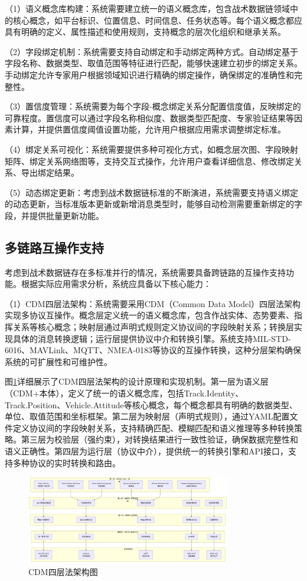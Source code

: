 （1）语义概念库构建：系统需要建立统一的语义概念库，包含战术数据链领域中的核心概念，如平台标识、位置信息、时间信息、任务状态等。每个语义概念都应具有明确的定义、属性描述和使用规则，支持概念的层次化组织和继承关系。

（2）字段绑定机制：系统需要支持自动绑定和手动绑定两种方式。自动绑定基于字段名称、数据类型、取值范围等特征进行匹配，能够快速建立初步的绑定关系。手动绑定允许专家用户根据领域知识进行精确的绑定操作，确保绑定的准确性和完整性。

（3）置信度管理：系统需要为每个字段-概念绑定关系分配置信度值，反映绑定的可靠程度。置信度可以通过字段名称相似度、数据类型匹配度、专家验证结果等因素计算，并提供置信度阈值设置功能，允许用户根据应用需求调整绑定标准。

（4）绑定关系可视化：系统需要提供多种可视化方式，如概念层次图、字段映射矩阵、绑定关系网络图等，支持交互式操作，允许用户查看详细信息、修改绑定关系、导出绑定结果。

（5）动态绑定更新：考虑到战术数据链标准的不断演进，系统需要支持语义绑定的动态更新，当标准版本更新或新增消息类型时，能够自动检测需要重新绑定的字段，并提供批量更新功能。

\subsection{多链路互操作支持}
考虑到战术数据链存在多标准并行的情况，系统需要具备跨链路的互操作支持功能\cite{AFCEA_Link16_Improvements_2022}。根据实际应用需求分析，系统应具备以下核心能力：

（1）CDM四层法架构：系统需要采用CDM（Common Data Model）四层法架构实现多协议互操作。概念层定义统一的语义概念库，包含作战实体、态势要素、指挥关系等核心概念；映射层通过声明式规则定义协议间的字段映射关系；转换层实现具体的消息转换逻辑；运行层提供协议中介和转换引擎。系统支持MIL-STD-6016、MAVLink、MQTT、NMEA-0183等协议的互操作转换，这种分层架构确保系统的可扩展性和可维护性。

图\ref{fig_cdm_architecture}详细展示了CDM四层法架构的设计原理和实现机制。第一层为语义层（CDM+本体），定义了统一的语义概念库，包括Track.Identity、Track.Position、Vehicle.Attitude等核心概念，每个概念都具有明确的数据类型、单位、取值范围和坐标框架。第二层为映射层（声明式规则），通过YAML配置文件定义协议间的字段映射关系，支持精确匹配、模糊匹配和语义推理等多种转换策略。第三层为校验层（强约束），对转换结果进行一致性验证，确保数据完整性和语义正确性。第四层为运行层（协议中介），提供统一的转换引擎和API接口，支持多种协议的实时转换和路由。

\begin{figure}[H]
    \centering
    \includegraphics[width=0.8\textwidth,height=0.5\textheight,keepaspectratio]{chapters/fig-0/cdm_architecture.png}
    \caption{CDM四层法架构图}
    \label{fig_cdm_architecture}
\end{figure}

